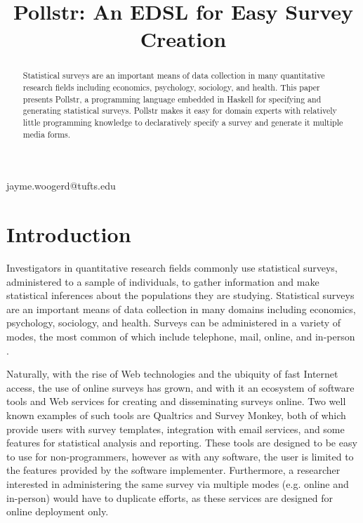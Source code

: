 \documentclass[pldi]{sigplanconf-pldi15}
\begin{document}
%
%

\title{Pollstr: An EDSL for Easy Survey Creation}
 {jayme.woogerd@tufts.edu}

\maketitle
\begin{abstract}
Statistical surveys are an important means of data collection in many 
quantitative research fields including economics, psychology, sociology, and health.
This paper presents Pollstr, a programming language embedded in Haskell for 
specifying and generating statistical surveys. Pollstr makes it easy for 
domain experts with relatively little programming knowledge to declaratively 
specify a survey and generate it multiple media forms.
\end{abstract}

\section{Introduction}

Investigators in quantitative research fields commonly use statistical surveys, administered 
to a sample of individuals, to gather information and make statistical 
inferences about the populations they are studying. Statistical
surveys are an important means of data collection in many domains including
economics, psychology, sociology, and health. Surveys can be administered in a 
variety of modes, the most common of which include telephone, mail, online, 
and in-person \cite{scheuren}.

Naturally, with the rise of 
Web technologies and the ubiquity of fast Internet access, the use of online
surveys has grown, and with it an ecosystem of software tools and Web
services for creating and disseminating surveys online. Two well known examples
of such tools are Qualtrics and Survey Monkey, both of which provide users with 
survey templates, integration with email services, and some features for 
statistical analysis and reporting. These tools are designed to be easy to use 
for non-programmers, however as with any software, the user is limited to the
features provided by the software implementer. Furthermore, a researcher 
interested in administering the same survey via multiple modes (e.g. online and 
in-person) would have to duplicate efforts, as these services are designed for 
online deployment only.
\end{document}
